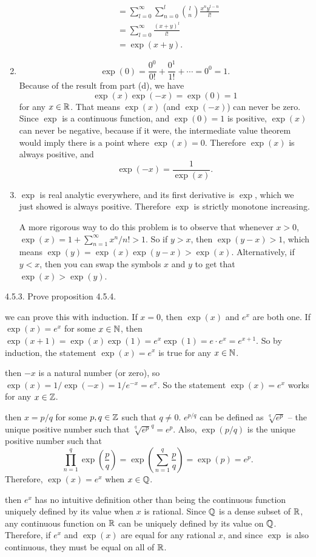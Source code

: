 \documentclass{article}
\begin{document}
\begin{enumerate}[label=(\alph*)]
\begin{align*}
                            &= \sum_{l=0}^\infty \sum_{n=0}^l \binom{l}{n} \frac{x^n y^{l-n}}{l!} \\
                            &= \sum_{l=0}^\infty \frac{(x+y)^l}{l!} \\
                            &= \exp (x+y).
        \end{align*}
    \item
        \[ \exp(0) = \frac{0^0}{0!} + \frac{0^1}{1!} + \cdots = 0^0 = 1. \]
        Because of the result from part (d), we have
        \[ \exp(x)\exp(-x) = \exp(0)=1 \]
        for any $x \in \mathbb{R}$. That means $\exp(x)$ (and $\exp(-x)$) can never be zero. Since $\exp$ is a continuous function, and $\exp(0)=1$ is positive, $\exp(x)$ can never be negative, because if it were, the intermediate value theorem would imply there is a point where $\exp(x)=0$. Therefore $\exp(x)$ is always positive, and
        \[ \exp(-x) = \frac{1}{\exp(x)}. \]
    \item $\exp$ is real analytic everywhere, and its first derivative is $\exp$, which we just showed is always positive. Therefore $\exp$ is strictly monotone increasing.
        \par
        A more rigorous way to do this problem is to observe that whenever $x > 0$, $\exp(x) = 1 + \sum_{n=1}^\infty x^n/n! > 1$. So if $y > x$, then $\exp(y-x)>1$, which means $\exp(y)=\exp(x)\exp(y-x)>\exp(x)$. Alternatively, if $y < x$, then you can swap the symbols $x$ and $y$ to get that $\exp(x)>\exp(y)$.
\end{enumerate}


\bigskip
\begin{prob}
    4.5.3. Prove proposition 4.5.4.
\end{prob}
 we can prove this with induction. If $x=0$, then $\exp(x)$ and $e^x$ are both one. If $\exp(x)=e^x$ for some $x \in \mathbb{N}$, then $\exp(x+1)=\exp(x)\exp(1)=e^x\exp(1)=e\cdot e^x=e^{x+1}$. So by induction, the statement $\exp(x)=e^x$ is true for any $x \in \mathbb{N}$.
\par
{} then $-x$ is a natural number (or zero), so $\exp(x)=1/\exp(-x)=1/e^{-x}=e^x$. So the statement $\exp(x)=e^x$ works for any $x \in \mathbb{Z}$.
\par
{} then $x=p/q$ for some $p,q \in \mathbb{Z}$ such that $q\neq 0$. $e^{p/q}$ can be defined as $\sqrt[q]{e^p}$ -- the unique positive number such that $\sqrt[q]{e^p}^q=e^p$. Also, $\exp(p/q)$ is the unique positive number such that
\[ \prod_{n=1}^q \exp \left( \frac{p}{q} \right) = \exp \left( \sum_{n=1}^q \frac{p}{q} \right) = \exp(p) = e^p. \]
Therefore, $\exp(x)=e^x$ when $x \in \mathbb{Q}$.
\par
{} then $e^x$ has no intuitive definition other than being the continuous function uniquely defined by its value when $x$ is rational. Since $\mathbb{Q}$ is a dense subset of $\mathbb{R}$, any continuous function on $\mathbb{R}$ can be uniquely defined by its value on $\mathbb{Q}$. Therefore, if $e^x$ and $\exp(x)$ are equal for any rational $x$, and since $\exp$ is also continuous, they must be equal on all of $\mathbb{R}$.
\end{document}
